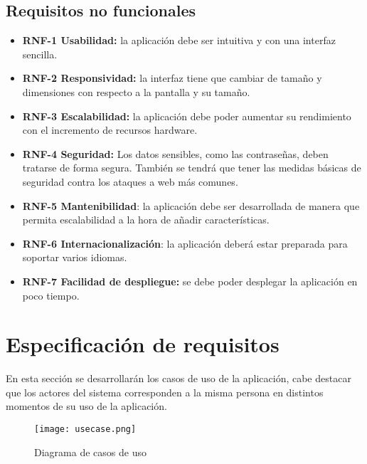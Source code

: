 \subsection{Requisitos no funcionales}

\begin{itemize}
\tightlist
\item
  \textbf{RNF-1 Usabilidad:} la aplicación debe ser intuitiva y con una interfaz sencilla.
\item
  \textbf{RNF-2 Responsividad:} la interfaz tiene que cambiar de tamaño y dimensiones con respecto a la pantalla y su tamaño.
\item
  \textbf{RNF-3 Escalabilidad:} la aplicación debe poder aumentar su rendimiento con el incremento de recursos hardware.
\item
  \textbf{RNF-4 Seguridad:} Los datos sensibles, como las contraseñas, deben tratarse de forma segura. También se tendrá que tener las medidas básicas de seguridad contra los ataques a web más comunes.
\item
  \textbf{RNF-5 Mantenibilidad}: la aplicación debe ser desarrollada de manera que permita escalabilidad a la hora de añadir características. 
\item
  \textbf{RNF-6 Internacionalización}: la aplicación deberá estar preparada para soportar varios idiomas.
\item
  \textbf{RNF-7 Facilidad de despliegue:} se debe poder desplegar la aplicación en poco tiempo.
\end{itemize}

\section{Especificación de requisitos}
En esta sección se desarrollarán los casos de uso de la aplicación, cabe destacar que los actores del sistema corresponden a la misma persona en distintos momentos de su uso de la aplicación.

\begin{figure}
	\centering
	\texttt{[image: usecase.png]}
	\caption{Diagrama de casos de uso}\label{fig:usecase.png}
\end{figure}




